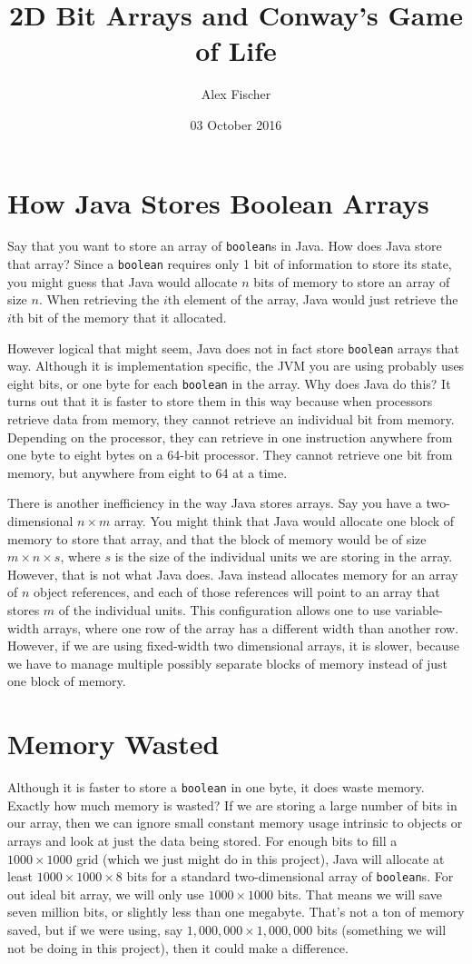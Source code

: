 \documentclass[a4paper]{article}
\title{2D Bit Arrays and Conway's Game of Life}
\author{Alex Fischer}
\date{03 October 2016}
\newcommand{\inlinecode}{\texttt}
\begin{document}
\maketitle
\section{How Java Stores Boolean Arrays}
Say that you want to store an array of \inlinecode{boolean}s in Java. How does Java store that array? Since a \inlinecode{boolean} requires only 1 bit of information to store its state, you might guess that Java would allocate $n$ bits of memory to store an array of size $n$. When retrieving the $i$th element of the array, Java would just retrieve the $i$th bit of the memory that it allocated.

However logical that might seem, Java does not in fact store \inlinecode{boolean} arrays that way. Although it is implementation specific, the JVM you are using probably uses eight bits, or one byte for each \inlinecode{boolean} in the array. Why does Java do this? It turns out that it is faster to store them in this way because when processors retrieve data from memory, they cannot retrieve an individual bit from memory. Depending on the processor, they can retrieve in one instruction anywhere from one byte to eight bytes on a 64-bit processor. They cannot retrieve one bit from memory, but anywhere from eight to 64 at a time.

There is another inefficiency in the way Java stores arrays. Say you have a two-dimensional $n\times m$ array. You might think that Java would allocate one block of memory to store that array, and that the block of memory would be of size $m\times n\times s$, where $s$ is the size of the individual units we are storing in the array. However, that is not what Java does. Java instead allocates memory for an array of $n$ object references, and each of those references will point to an array that stores $m$ of the individual units. This configuration allows one to use variable-width arrays, where one row of the array has a different width than another row. However, if we are using fixed-width two dimensional arrays, it is slower, because we have to manage multiple possibly separate blocks of memory instead of just one block of memory.
\section{Memory Wasted}
Although it is faster to store a \inlinecode{boolean} in one byte, it does waste memory. Exactly how much memory is wasted? If we are storing a large number of bits in our array, then we can ignore small constant memory usage intrinsic to objects or arrays and look at just the data being stored. For enough bits to fill a $1000\times 1000$ grid (which we just might do in this project), Java will allocate at least $1000\times 1000\times 8$ bits for a standard two-dimensional array of \inlinecode{boolean}s. For out ideal bit array, we will only use $1000\times 1000$ bits. That means we will save seven million bits, or slightly less than one megabyte. That's not a ton of memory saved, but if we were using, say $1,000,000\times 1,000,000$ bits (something we will not be doing in this project), then it could make a difference.
\end{document}
